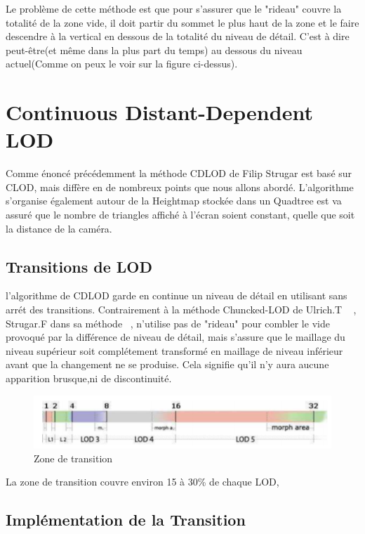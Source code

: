 Le problème de cette méthode est que pour s'assurer que le "rideau" couvre la totalité de la zone vide, il doit partir du sommet le plus haut de la zone et le faire descendre à la vertical en dessous de la totalité du niveau de détail. C'est à dire peut-être(et même dans la plus part du temps) au dessous du niveau actuel(Comme on peux le voir sur la figure ci-dessus).

\section{Continuous Distant-Dependent LOD}

Comme énoncé précédemment la méthode CDLOD de Filip Strugar est basé sur CLOD, mais diffère en de nombreux points que nous allons abordé.
L'algorithme s'organise également autour de la Heightmap stockée dans un Quadtree est va assuré que le nombre de triangles affiché à l'écran soient constant, quelle que soit la distance de la caméra.

\subsection{Transitions de LOD}
    l'algorithme de CDLOD garde en continue un niveau de détail en utilisant sans arrét des transitions. Contrairement à la méthode Chuncked-LOD de Ulrich.T ~\cite{CLOD} , Strugar.F dans sa méthode ~\cite{CDLOD}, n'utilise pas de "rideau" pour combler le vide provoqué par la différence de niveau de détail, mais s'assure que le maillage du niveau supérieur soit complétement transformé en maillage de niveau inférieur avant que la changement ne se produise. Cela signifie qu'il n'y aura aucune apparition brusque,ni de discontinuité.
    
\begin{figure}[!ht]
    \includegraphics[width=12cm]{img/morph-area.png}
    \caption[morph-area]{Zone de transition \protect\footnotemark}
    \label{fig:morph-area}
\end{figure}
    
    La zone de transition couvre environ 15 à 30\% de chaque LOD,
    
\subsection{Implémentation de la Transition}

